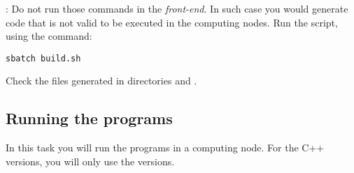 : 
Do not run those commands in the \emph{front-end}.
In such case you would generate code that is not valid to be executed
in the computing nodes.
Run the script, using the command:

\begin{lstlisting}[style=terminal]
sbatch build.sh
\end{lstlisting}

Check the files generated in directories
and .

\subsection{Running the programs}

In this task you will run the programs in a computing node.
For the C++ versions, you will only use the  versions.

